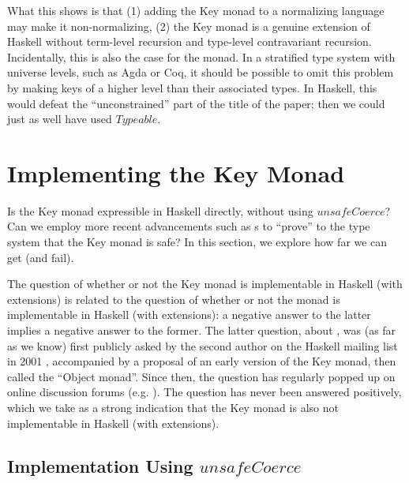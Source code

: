 \documentclass{sigplanconf}
\newcommand{\Conid}[1]{\mathit{#1}}
\newcommand{\Varid}[1]{\mathit{#1}}
\begin{document}
What this shows is that (1) adding the Key monad to a normalizing language may make it non-normalizing, (2) the Key monad is a genuine extension of Haskell without term-level recursion and type-level contravariant recursion. Incidentally, this is also the case for the \st{} monad. In a stratified type system with universe levels, such as Agda or Coq, it should be possible to omit this problem by making keys of a higher level than their associated types. In Haskell, this would defeat the ``unconstrained'' part of the title of the paper; then we could just as well have used \ensuremath{\Conid{Typeable}}.

\section{Implementing the Key Monad}
\label{impl}
Is the Key monad expressible in Haskell directly, without using \ensuremath{\Varid{unsafeCoerce}}? Can we employ more recent advancements such as  \gadt s to ``prove'' to the type system that the Key monad is safe? In this section, we explore how far we can get (and fail).

The question of whether or not the Key monad is implementable in Haskell (with extensions) is related to the question of whether or not the \st{} monad is implementable in Haskell (with extensions): a negative answer to the latter implies a negative answer to the former. The latter question, about \st{}, was (as far as we know) first publicly asked by the second author on the Haskell mailing list in 2001 \cite{koen2001}, accompanied by a proposal of an early version of the Key monad, then called the ``Object monad''. Since then, the question has regularly popped up on online discussion forums (e.g. \cite{reddit}). The question has never been answered positively, which we take as a strong indication that the Key monad is also not implementable in Haskell (with extensions).

\subsection{Implementation Using \ensuremath{\Varid{unsafeCoerce}}}
\end{document}
